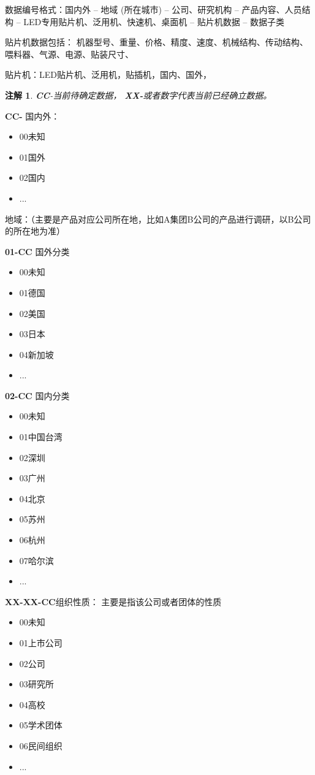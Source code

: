 \documentclass[a4paper,12pt,UTF8]{article}
\newtheorem{remark}{注解}
\begin{document}
数据编号格式：国内外 -- 地域 (所在城市) -- 公司、研究机构 -- 产品内容、人员结构 -- LED专用贴片机、泛用机、快速机、桌面机 -- 贴片机数据 -- 数据子类

贴片机数据包括：
机器型号、重量、价格、精度、速度、机械结构、传动结构、喂料器、气源、电源、贴装尺寸、

贴片机：LED贴片机、泛用机，贴插机，国内、国外，

\begin{remark}
\textbf{CC}-当前待确定数据， \textbf{XX-}或者数字代表当前已经确立数据。
\end{remark}

\textbf{{CC-}} 国内外：
\begin{itemize}
  \item 00未知%
  \item 01国外%
  \item 02国内%
  \item ...
\end{itemize}

地域：（主要是产品对应公司所在地，比如A集团B公司的产品进行调研，以B公司的所在地为准）

\textbf{01-CC} 国外分类
\begin{itemize}
  \item 00未知%
  \item 01德国%
  \item 02美国%
  \item 03日本%
  \item 04新加坡
  \item ...
\end{itemize}

\textbf{02-CC} 国内分类
\begin{itemize}
  \item 00未知%
  \item 01中国台湾
  \item 02深圳
  \item 03广州
  \item 04北京
  \item 05苏州
  \item 06杭州
  \item 07哈尔滨
  \item ...
\end{itemize}


\textbf{XX-XX-CC}组织性质： 主要是指该公司或者团体的性质
\begin{itemize}
  \item 00未知%
  \item 01上市公司
  \item 02公司
  \item 03研究所
  \item 04高校
  \item 05学术团体
  \item 06民间组织
  \item ...
\end{itemize}
\end{document}
